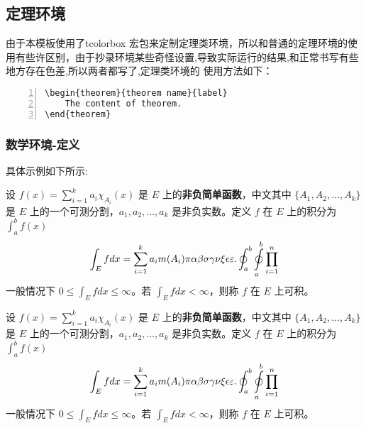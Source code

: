 \subsection{定理环境}
由于本模板使用了tcolorbox 宏包来定制定理类环境，所以和普通的定理环境的使用有些许区别，由于抄录环境某些奇怪设置,导致实际运行的结果,和正常书写有些地方存在色差,所以两者都写了,定理类环境的
使用方法如下：
\begin{lstlisting}[backgroundcolor=\color{gray!5},framerule=1pt,frame=tb,numbers=left,
    numberstyle=\tiny\color{black},]
\begin{theorem}{theorem name}{label}
    The content of theorem.
\end{theorem}
\end{lstlisting}

\subsubsection{数学环境-定义}
具体示例如下所示:
\begin{definition}[可积性] \label{def:int} 
    设 $ f(x)=\sum\limits_{i=1}^{k} a_i \chi_{A_i}(x)$ 是 $E$ 上的\textbf{非负简单函数}，中文其中 $\{A_1,A_2,\ldots,A_k\}$ 是 $E$ 上的一个可测分割，$a_1,a_2,\ldots,a_k$ 是非负实数。定义 $f$ 在 $E$ 上的积分为 $\int_{a}^b f(x)$
    \begin{equation}\label{inter}
        \int_{E} f dx = \sum_{i=1}^k a_i m(A_i) \pi \alpha\beta\sigma\gamma\nu\xi\epsilon\varepsilon. \oint_{a}^b\ointop_{a}^b\prod_{i=1}^n
    \end{equation}
    一般情况下 $0 \leq \int_{E} f dx \leq \infty$。若 $\int_{E} f dx < \infty$，则称 $f$ 在 $E$ 上可积。
\end{definition}
\begin{tcblisting}{}
\begin{definition}[可积性] \label{def:int} 
设 $ f(x)=\sum\limits_{i=1}^{k} a_i \chi_{A_i}(x)$ 是 $E$ 上的\textbf{非负简单函数}，中文其中 $\{A_1,A_2,\ldots,A_k\}$ 是 $E$ 上的一个可测分割，$a_1,a_2,\ldots,a_k$ 是非负实数。定义 $f$ 在 $E$ 上的积分为 $\int_{a}^b f(x)$
\begin{equation}\label{inter}
\int_{E} f dx = \sum_{i=1}^k a_i m(A_i) \pi \alpha\beta\sigma\gamma\nu\xi\epsilon\varepsilon. \oint_{a}^b\ointop_{a}^b\prod_{i=1}^n
\end{equation}
一般情况下 $0 \leq \int_{E} f dx \leq \infty$。若 $\int_{E} f dx < \infty$，则称 $f$ 在 $E$ 上可积。
\end{definition}
\end{tcblisting}


